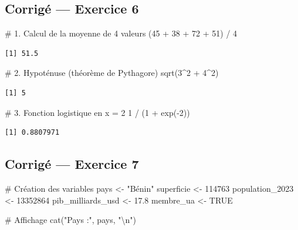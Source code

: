\documentclass[
  french,
  11pt,
  a4paper,
]{article}
\newenvironment{Shaded}{}{}
\newcommand{\CommentTok}[1]{\textcolor[rgb]{0.42,0.45,0.49}{#1}}
\newcommand{\ConstantTok}[1]{\textcolor[rgb]{0.00,0.36,0.77}{#1}}
\newcommand{\DecValTok}[1]{\textcolor[rgb]{0.00,0.36,0.77}{#1}}
\newcommand{\FloatTok}[1]{\textcolor[rgb]{0.00,0.36,0.77}{#1}}
\newcommand{\FunctionTok}[1]{\textcolor[rgb]{0.44,0.26,0.76}{#1}}
\newcommand{\NormalTok}[1]{\textcolor[rgb]{0.14,0.16,0.18}{#1}}
\newcommand{\OtherTok}[1]{\textcolor[rgb]{0.44,0.26,0.76}{#1}}
\newcommand{\SpecialCharTok}[1]{\textcolor[rgb]{0.00,0.36,0.77}{#1}}
\newcommand{\StringTok}[1]{\textcolor[rgb]{0.01,0.18,0.38}{#1}}
\begin{document}
\subsection{Corrigé --- Exercice 6}\label{corriguxe9-exercice-6}

\begin{Shaded}
\begin{Highlighting}[]
\CommentTok{\# 1. Calcul de la moyenne de 4 valeurs}
\NormalTok{(}\DecValTok{45} \SpecialCharTok{+} \DecValTok{38} \SpecialCharTok{+} \DecValTok{72} \SpecialCharTok{+} \DecValTok{51}\NormalTok{) }\SpecialCharTok{/} \DecValTok{4}
\end{Highlighting}
\end{Shaded}

\begin{verbatim}
[1] 51.5
\end{verbatim}

\begin{Shaded}
\begin{Highlighting}[]
\CommentTok{\# 2. Hypoténuse (théorème de Pythagore)}
\FunctionTok{sqrt}\NormalTok{(}\DecValTok{3}\SpecialCharTok{\^{}}\DecValTok{2} \SpecialCharTok{+} \DecValTok{4}\SpecialCharTok{\^{}}\DecValTok{2}\NormalTok{)}
\end{Highlighting}
\end{Shaded}

\begin{verbatim}
[1] 5
\end{verbatim}

\begin{Shaded}
\begin{Highlighting}[]
\CommentTok{\# 3. Fonction logistique en x = 2}
\DecValTok{1} \SpecialCharTok{/}\NormalTok{ (}\DecValTok{1} \SpecialCharTok{+} \FunctionTok{exp}\NormalTok{(}\SpecialCharTok{{-}}\DecValTok{2}\NormalTok{))}
\end{Highlighting}
\end{Shaded}

\begin{verbatim}
[1] 0.8807971
\end{verbatim}

\subsection{Corrigé --- Exercice 7}\label{corriguxe9-exercice-7}

\begin{Shaded}
\begin{Highlighting}[]
\CommentTok{\# Création des variables}
\NormalTok{pays }\OtherTok{\textless{}{-}} \StringTok{"Bénin"}
\NormalTok{superficie }\OtherTok{\textless{}{-}} \DecValTok{114763}
\NormalTok{population\_2023 }\OtherTok{\textless{}{-}} \DecValTok{13352864}
\NormalTok{pib\_milliards\_usd }\OtherTok{\textless{}{-}} \FloatTok{17.8}
\NormalTok{membre\_ua }\OtherTok{\textless{}{-}} \ConstantTok{TRUE}

\CommentTok{\# Affichage}
\FunctionTok{cat}\NormalTok{(}\StringTok{"Pays :"}\NormalTok{, pays, }\StringTok{"}\SpecialCharTok{\textbackslash{}n}\StringTok{"}\NormalTok{)}
\end{Highlighting}
\end{Shaded}
\end{document}
